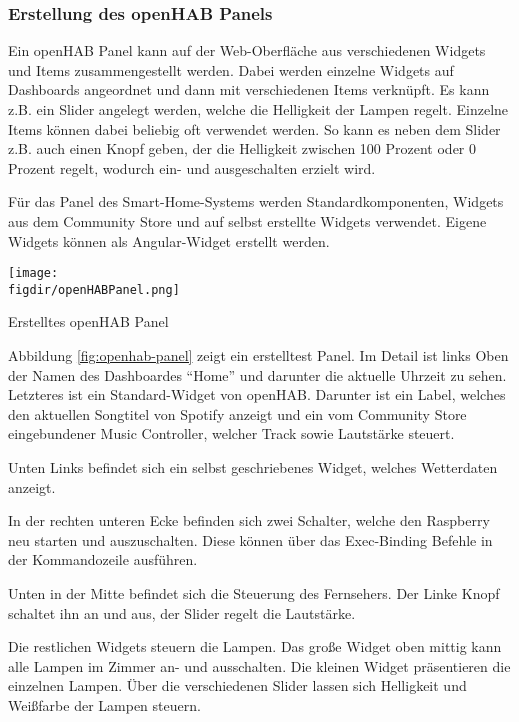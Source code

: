 		\subsubsection{Erstellung des openHAB Panels}
		Ein openHAB Panel kann auf der Web-Oberfläche aus verschiedenen Widgets und Items zusammengestellt werden. Dabei werden einzelne Widgets auf Dashboards angeordnet und dann mit verschiedenen Items verknüpft. Es kann z.B. ein Slider angelegt werden, welche die Helligkeit der Lampen regelt. Einzelne Items können dabei beliebig oft verwendet werden. So kann es neben dem Slider z.B. auch einen Knopf geben, der die Helligkeit zwischen 100 Prozent oder 0 Prozent regelt, wodurch ein- und ausgeschalten erzielt wird.
		
		Für das Panel des Smart-Home-Systems werden Standardkomponenten, Widgets aus dem Community Store und auf selbst erstellte Widgets verwendet. Eigene Widgets können als Angular-Widget erstellt werden.
		
		\smallskip
	\begin{minipage}{\textwidth}
		\centering
		\captionsetup{type=figure}
		\texttt{[image: \\figdir/openHABPanel.png]}
		\caption{Erstelltes openHAB Panel \label{fig:openhab-panel}}
	\end{minipage}
		
		\smallskip
		Abbildung \ref{fig:openhab-panel} zeigt ein erstelltest Panel. Im Detail ist links Oben der Namen des Dashboardes "`Home"' und darunter die aktuelle Uhrzeit zu sehen. Letzteres ist ein Standard-Widget von openHAB.
		Darunter ist ein Label, welches den aktuellen Songtitel von Spotify anzeigt und ein vom Community Store eingebundener Music Controller, welcher Track sowie Lautstärke steuert.

		Unten Links befindet sich ein selbst geschriebenes Widget, welches Wetterdaten anzeigt.

		In der rechten unteren Ecke befinden sich zwei Schalter, welche den Raspberry neu starten und auszuschalten. Diese können über das Exec-Binding Befehle in der Kommandozeile ausführen.
		
		Unten in der Mitte befindet sich die Steuerung des Fernsehers. Der Linke Knopf schaltet ihn an und aus, der Slider regelt die Lautstärke.
		
		Die restlichen Widgets steuern die Lampen. Das große Widget oben mittig kann alle Lampen im Zimmer an- und ausschalten. Die kleinen Widget präsentieren die einzelnen Lampen. Über die verschiedenen Slider lassen sich Helligkeit und Weißfarbe der Lampen steuern.
		
